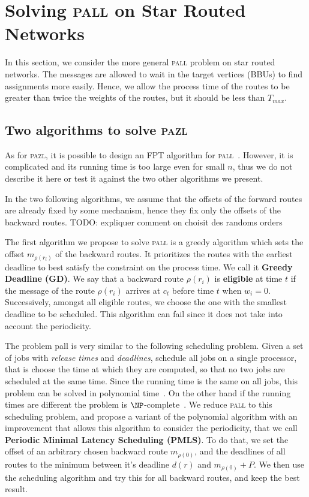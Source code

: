 \documentclass[10pt, conference, letterpaper]{IEEEtran}
\newcommand{\todo}[1]{{\color{red} TODO: {#1}}}
\newcommand\pazl{\textsc{pazl}\xspace}
\newcommand\pall{\textsc{pall}\xspace}
\begin{document}
         \section{Solving \pall on Star Routed Networks}\label{sec:PALL}
    In this section, we consider the more general \pall problem on star routed networks. The messages are allowed to wait in the target vertices (BBUs) to find assignments more easily. Hence, we allow the process time of the routes to be greater than twice the weights of the routes, but it should be less than $T_{max}$.
  
  \subsection{Two algorithms to solve \pazl}
  
  As for \pazl, it is possible to design an FPT algorithm for \pall~\cite{}. 
  However, it is complicated and its running time is too large even for small $n$,
  thus we do not describe it here or test it against the two other algorithms we present.
  
  In the two following algorithms, we assume that the offsets of the forward routes are already fixed by some mechanism, hence they fix only the offsets of the backward routes. \todo{expliquer comment on choisit des randoms orders}
  
    The first algorithm we propose to solve \pall is a greedy algorithm which sets the offset $m_{\rho(r_i)}$ of the 
    backward routes. It prioritizes the routes with the earliest deadline to best satisfy the
    constraint on the process time. We call it \textbf{Greedy Deadline (GD)}. We say that a backward route $\rho(r_i)$ is {\bf eligible} at time $t$ if the message of the route $\rho(r_i)$ arrives at $c_t$ before time $t$ when $w_i = 0$. Successively, amongst all eligible routes, we choose the one with the smallest deadline to be scheduled.
    This algorithm can fail since it does not take into account the periodicity.
    

     
     The problem pall is very similar to the following scheduling problem. Given a set of jobs with \emph{release times} and  \emph{deadlines}, schedule all jobs on a single processor, that is choose the time at which they are computed, so that no two jobs are scheduled at the same time. Since the running time is the same on all jobs, this problem can be solved in polynomial time~\cite{simons1978fast}. On the other hand if the running times are different the problem is $\NP$-complete~\cite{lenstra1977complexity}. 
     We reduce \pall to this scheduling problem, and propose a variant of the polynomial algorithm with an improvement that allows this algorithm to consider the periodicity, that we call {\bf Periodic Minimal Latency Scheduling (PMLS)}. To do that, we set the offset of an arbitrary chosen backward route $m_{\rho(0)}$, and the deadlines of all routes to the minimum between it's deadline $d(r)$ and $m_{\rho(0)} + P$. We then use the scheduling algorithm and try this for all backward routes, and keep the best result.
\end{document}
